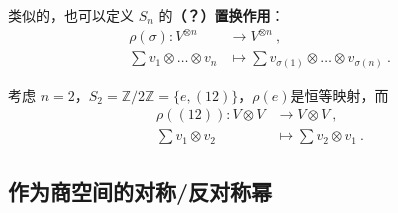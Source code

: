 类似的，也可以定义 $S_n$ 的\textbf{（？）置换作用}：
\begin{equation}
\begin{aligned}
\rho(\sigma): V^{\otimes n} &\to V^{\otimes n}~, \\
\sum v_1 \otimes \dots \otimes v_n &\mapsto \sum v_{\sigma(1)} \otimes \dots \otimes v_{\sigma(n)}~.
\end{aligned}
\end{equation}

\begin{example}{}
考虑 $n = 2$，$S_2 = \mathbb{Z}/2\mathbb{Z} = \{e, (1 2)\}$，$\rho(e)$是恒等映射，而
\begin{equation}
\begin{aligned}
\rho((1 2)): V \otimes V &\to V \otimes V~, \\
\sum v_1 \otimes v_2 &\mapsto \sum v_2 \otimes v_1~.
\end{aligned}
\end{equation}
\end{example}

\subsection{作为商空间的对称/反对称幂}